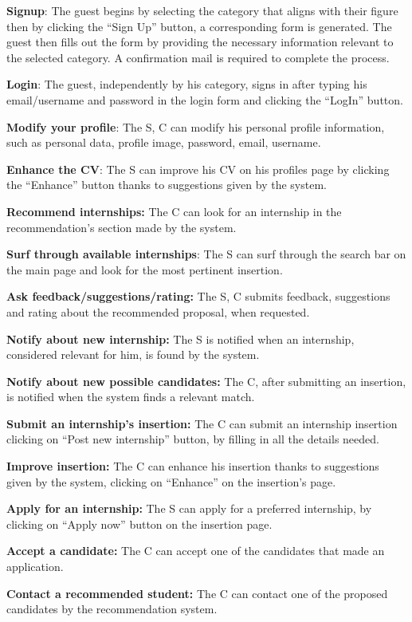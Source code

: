 \textbf{Signup}: The guest begins by selecting the category that aligns
with their figure then by clicking the ``Sign Up'' button, a
corresponding form is generated. The guest then fills out the form by
providing the necessary information relevant to the selected category. A
confirmation mail is required to complete the process.~

\textbf{Login}: The guest, independently by his category, signs in after
typing his email/username and password in the login form and clicking
the ``LogIn'' button.

\textbf{Modify your profile}: The S, C can modify his personal profile
information, such as personal data, profile image, password, email,
username.

\textbf{Enhance the CV}: The S can improve his CV on his
profile\textquotesingle s page by clicking the ``Enhance'' button thanks
to suggestions given by the system.

\textbf{Recommend internships:} The C can look for an internship in the
recommendation's section made by the system.

\textbf{Surf through available internships}: The S can surf through the
search bar on the main page and look for the most pertinent insertion.

\textbf{Ask feedback/suggestions/rating:} The S, C submits feedback,
suggestions and rating about the recommended proposal, when requested.

\textbf{Notify about new internship:} The S is notified when an
internship, considered relevant for him, is found by the system.

\textbf{Notify about new possible candidates:} The C, after submitting
an insertion, is notified when the system finds a relevant match.

\textbf{Submit an internship's insertion:} The C can submit an
internship insertion clicking on ``Post new internship'' button, by
filling in all the details needed.

\textbf{Improve insertion:} The C can enhance his insertion thanks to
suggestions given by the system, clicking on ``Enhance'' on the
insertion's page.

\textbf{Apply for an internship:} The S can apply for a preferred
internship, by clicking on ``Apply now'' button on the insertion page.

\textbf{Accept a candidate:} The C can accept one of the candidates that
made an application.

\textbf{Contact a recommended student:} The C can contact one of the
proposed candidates by the recommendation system.

